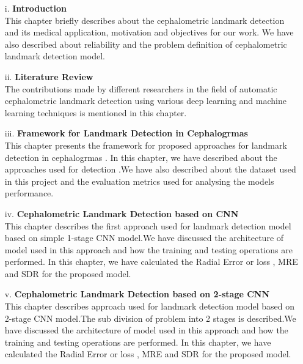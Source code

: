 \documentclass[sn-mathphys]{sn-jnl}%
\theoremstyle{thmstyleone}%
\theoremstyle{thmstyletwo}%
\theoremstyle{thmstylethree}%
\begin{document}
\begin{itemize}

\item[i.] \textbf{Introduction}\\
This chapter briefly describes about the cephalometric landmark detection and its medical application, motivation and objectives for our work. We have also described about reliability and the problem definition of cephalometric landmark detection model.

\item[ii.] \textbf{Literature Review}\\
The contributions made by different researchers in the field of automatic cephalometric landmark detection using various deep learning and machine learning techniques is mentioned in this chapter.

\item[iii.] \textbf{ Framework for Landmark Detection in Cephalogrmas}\\
This chapter presents the framework for proposed approaches for landmark detection in cephalogrmas . In this
chapter, we have described about the approaches used for detection .We have also described about the dataset used in this project and the evaluation metrics used for analysing the models performance.

\item[iv.] \textbf{Cephalometric Landmark Detection based on CNN}\\
This chapter describes the first approach used for  landmark detection model based on simple 1-stage CNN model.We have discussed the architecture of model used in this approach and how the training and testing operations are performed. In this
chapter, we have calculated the Radial Error or loss , MRE and SDR  for the proposed model.

\item[v.] \textbf{ Cephalometric Landmark Detection based on 2-stage CNN}\\
This chapter describes approach used for  landmark detection model based on 2-stage CNN model.The sub division of problem into 2 stages is described.We have discussed the architecture of model used in this approach and how the training and testing operations are performed. In this chapter, we have calculated the Radial Error or loss , MRE and SDR  for the proposed model.


\end{itemize}
\end{document}
